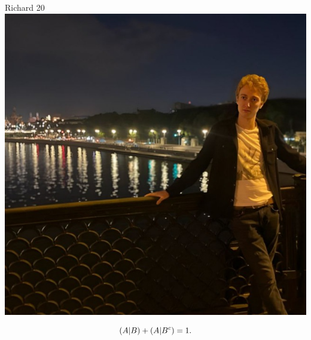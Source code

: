 \documentclass[12pt]{article}
\let\P\relax
\DeclareMathOperator{\P}{\mathbb{P}}
\begin{document}
\begin{minipage}{0.45\textwidth}
\begin{tinderm}{Richard 20}
\includegraphics[width=\textwidth]{tinder-photo/richard.jpg}

  

\begin{mybox}
\[
\P(A|B) + \P(A|B^c) = 1.
\]
\end{mybox}
\end{tinderm}
\end{minipage}
%
%
\end{document}
